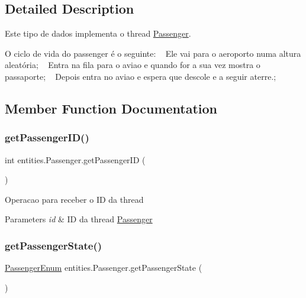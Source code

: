 \subsection{Detailed Description}
Este tipo de dados implementa o thread \hyperlink{classentities_1_1_passenger}{Passenger}.

O ciclo de vida do passenger é o seguinte\+: ~\newline
 Ele vai para o aeroporto numa altura aleatória; ~\newline
 Entra na fila para o aviao e quando for a sua vez mostra o passaporte; ~\newline
 Depois entra no aviao e espera que descole e a seguir aterre.; 

\subsection{Member Function Documentation}
\mbox{\label{classentities_1_1_passenger_a02039d310b9abd8d76438f86c4dd071f}} 
\subsubsection{\texorpdfstring{get\+Passenger\+I\+D()}{getPassengerID()}}
{\footnotesize\ttfamily int entities.\+Passenger.\+get\+Passenger\+ID (\begin{DoxyParamCaption}{ }\end{DoxyParamCaption})\hspace{0.3cm}{\ttfamily [inline]}}

Operacao para receber o ID da thread 
\begin{DoxyParams}{Parameters}
{\em id} & ID da thread \hyperlink{classentities_1_1_passenger}{Passenger} \\
\hline
\end{DoxyParams}
\mbox{\label{classentities_1_1_passenger_af9b423b481bf216dfe8fe019919e74fe}} 
\subsubsection{\texorpdfstring{get\+Passenger\+State()}{getPassengerState()}}
{\footnotesize\ttfamily \hyperlink{enumentities_1_1_passenger_enum}{Passenger\+Enum} entities.\+Passenger.\+get\+Passenger\+State (\begin{DoxyParamCaption}{ }\end{DoxyParamCaption})\hspace{0.3cm}{\ttfamily [inline]}}

